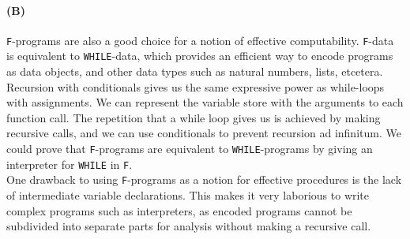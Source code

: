 \documentclass{article}
\begin{document}
\paragraph*{(B)}
\texttt{F}-programs are also a good choice for a notion of effective computability. \texttt{F}-data is equivalent to \texttt{WHILE}-data, which provides an efficient way to encode programs as data objects, and other data types such as natural numbers, lists, etcetera. Recursion with conditionals gives us the same expressive power as while-loops with assignments. We can represent the variable store with the arguments to each function call. The repetition that a while loop gives us is achieved by making recursive calls, and we can use conditionals to prevent recursion ad infinitum. We could prove that \texttt{F}-programs are equivalent to \texttt{WHILE}-programs by giving an interpreter for \texttt{WHILE} in \texttt{F}.\\
\indent One drawback to using \texttt{F}-programs as a notion for effective procedures is the lack of intermediate variable declarations. This makes it very laborious to write complex programs such as interpreters, as encoded programs cannot be subdivided into separate parts for analysis without making a recursive call.
\end{document}
